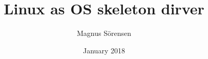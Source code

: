 


\title{Linux as OS skeleton dirver}
\author{Magnus Sörensen}
\date{January 2018}


\maketitle
{}
\providecommand{\cmark}[2][]{%
  \begin{pgfonlayer}{marx}
    \node[nmark] at (c#2#1) {#2};
  \end{pgfonlayer}{marx}
  }
\providecommand{\cmark}[2][]{\relax}


%
%


